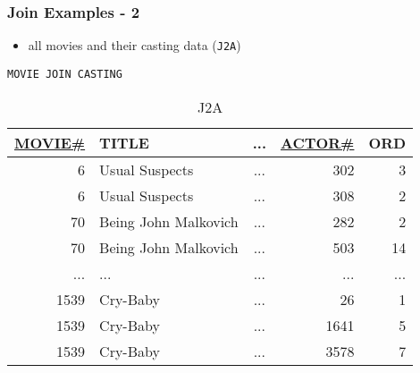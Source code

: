 \documentclass[dvipsnames]{beamer}
\theoremstyle{plain}
\begin{document}
\begin{frame}[fragile]
  \frametitle{Join Examples - 2}

  \begin{example}
    \begin{itemize}
      \item all movies and their casting data (\texttt{J2A})
    \end{itemize}

    \begin{lstlisting}
MOVIE JOIN CASTING
    \end{lstlisting}

    \pause
    \vspace{-10pt}
    \begin{tiny}
    \begin{table}
      \caption{J2A}
      \begin{tabular}{|r|l|c|r|r|}\hline
\underline{MOVIE\#} & TITLE & ... & \underline{ACTOR\#} & ORD\\[2pt]\hline\hline
   6 & Usual Suspects       & ... &                 302 &   3\\\hline
   6 & Usual Suspects       & ... &                 308 &   2\\\hline
  70 & Being John Malkovich & ... &                 282 &   2\\\hline
  70 & Being John Malkovich & ... &                 503 &  14\\\hline
 ... & ...                  & ... &                 ... & ...\\\hline
1539 & Cry-Baby             & ... &                  26 &   1\\\hline
1539 & Cry-Baby             & ... &                1641 &   5\\\hline
1539 & Cry-Baby             & ... &                3578 &   7\\\hline
      \end{tabular}
    \end{table}
    \end{tiny}
  \end{example}
\end{frame}
\end{document}
